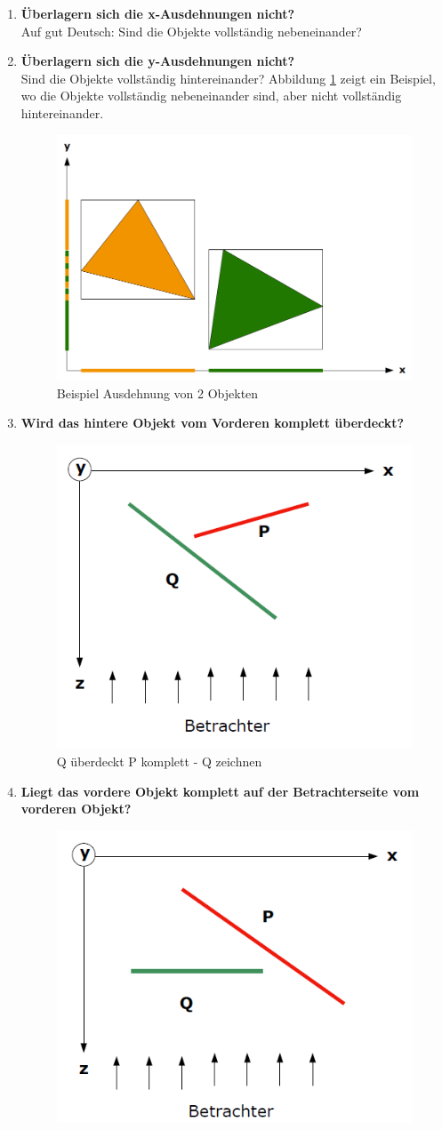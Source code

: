 \begin{enumerate}
	\item \textbf{Überlagern sich die x-Ausdehnungen nicht?} \\
	Auf gut Deutsch: Sind die Objekte vollständig nebeneinander?
	\item \textbf{Überlagern sich die y-Ausdehnungen nicht?} \\
	Sind die Objekte vollständig hintereinander? Abbildung \ref{fig:ausdehnungen} zeigt ein Beispiel, wo die Objekte vollständig nebeneinander sind, aber nicht vollständig hintereinander.
	\begin{figure}[!ht]
		\centering
		\includegraphics[width=0.5\linewidth]{fig/ausdehnungen}
		\caption{Beispiel Ausdehnung von 2 Objekten}
		\label{fig:ausdehnungen}
	\end{figure}
	\item \textbf{Wird das hintere Objekt vom Vorderen komplett überdeckt?}\\
	\begin{figure}[!ht]
		\centering
		\includegraphics[width=0.5\linewidth]{fig/tiefensortierung_3}
		\caption{Q überdeckt P komplett - Q zeichnen}
		\label{fig:tiefensortierung_3}
	\end{figure}
	\item \textbf{Liegt das vordere Objekt komplett auf der Betrachterseite vom vorderen Objekt?}\\
	\begin{figure}[!ht]
		\centering
		\includegraphics[width=0.5\linewidth]{fig/tiefensortierung_4}

\end{figure}
\end{enumerate}
